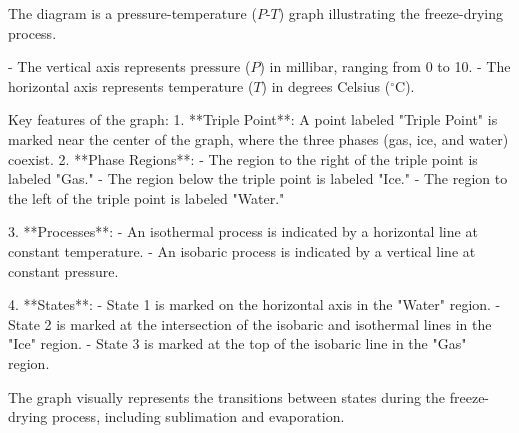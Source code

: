 The diagram is a pressure-temperature (\(P\)-\(T\)) graph illustrating the freeze-drying process.  

- The vertical axis represents pressure (\(P\)) in millibar, ranging from 0 to 10.  
- The horizontal axis represents temperature (\(T\)) in degrees Celsius (\(^\circ\text{C}\)).  

Key features of the graph:  
1. **Triple Point**: A point labeled "Triple Point" is marked near the center of the graph, where the three phases (gas, ice, and water) coexist.  
2. **Phase Regions**:  
   - The region to the right of the triple point is labeled "Gas."  
   - The region below the triple point is labeled "Ice."  
   - The region to the left of the triple point is labeled "Water."  

3. **Processes**:  
   - An isothermal process is indicated by a horizontal line at constant temperature.  
   - An isobaric process is indicated by a vertical line at constant pressure.  

4. **States**:  
   - State 1 is marked on the horizontal axis in the "Water" region.  
   - State 2 is marked at the intersection of the isobaric and isothermal lines in the "Ice" region.  
   - State 3 is marked at the top of the isobaric line in the "Gas" region.  

The graph visually represents the transitions between states during the freeze-drying process, including sublimation and evaporation.
